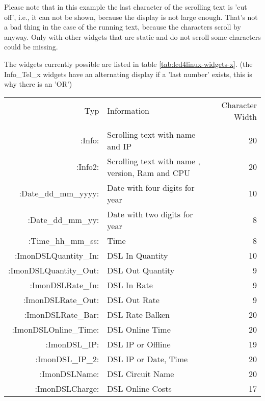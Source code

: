 \begin{description}
  Please note that in this example the last character of the scrolling text is
  'cut off', i.e., it can not be shown, because the display is not large enough.
  That's not a bad thing in the case of the running text, because the characters
  scroll by anyway. Only with other widgets that are static and do not scroll
  some characters could be missing.

  The widgets currently possible are listed in table \ref{tab:lcd4linux-widgets-x}.
  (the Info\_Tel\_x widgets have an alternating display if a 'last number' exists,
  this is why there is an 'OR')  

      \begin{small}
       \begin{center}
        \begin{longtable}{rp{7cm}r}

               Typ &     Information   &             Character Width\\
               \\
                  :Info: &       Scrolling text with name and IP    &  20 \\
                 :Info2: &       Scrolling text with name , version, Ram and CPU   &  20 \\

    :Date\_dd\_mm\_yyyy: &       Date with four digits for year &  10 \\
      :Date\_dd\_mm\_yy: &       Date with two digits for year &   8 \\
      :Time\_hh\_mm\_ss: &       Time                         &   8 \\                              

   :ImonDSLQuantity\_In: &       DSL In Quantity              &  10 \\
  :ImonDSLQuantity\_Out: &       DSL Out Quantity             &   9 \\
       :ImonDSLRate\_In: &       DSL In Rate                  &   9 \\
      :ImonDSLRate\_Out: &       DSL Out Rate                 &   9 \\
      :ImonDSLRate\_Bar: &       DSL Rate Balken              &  20 \\
   :ImonDSLOnline\_Time: &       DSL Online Time              &  20 \\
           :ImonDSL\_IP: &       DSL IP or Offline            &  19 \\
        :ImonDSL\_IP\_2: &       DSL IP or Date, Time         &  20 \\
           :ImonDSLName: &       DSL Circuit Name             &  20 \\
         :ImonDSLCharge: &       DSL Online Costs             &  17 \\
         

\end{longtable}
\end{center}
\end{small}
\end{description}
